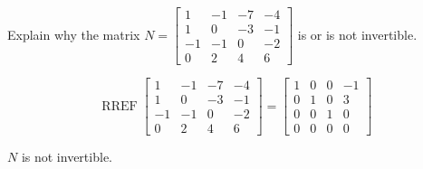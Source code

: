 
\begin{exerciseStatement}


Explain why the matrix \(N= \left[\begin{array}{cccc}
1 & -1 & -7 & -4 \\
1 & 0 & -3 & -1 \\
-1 & -1 & 0 & -2 \\
0 & 2 & 4 & 6
\end{array}\right] \) is or is not invertible.


\end{exerciseStatement}
    
\begin{exerciseAnswer} 


\[\operatorname{RREF} \left[\begin{array}{cccc}
1 & -1 & -7 & -4 \\
1 & 0 & -3 & -1 \\
-1 & -1 & 0 & -2 \\
0 & 2 & 4 & 6
\end{array}\right] = \left[\begin{array}{cccc}
1 & 0 & 0 & -1 \\
0 & 1 & 0 & 3 \\
0 & 0 & 1 & 0 \\
0 & 0 & 0 & 0
\end{array}\right] \]

\(N\) is not invertible.
\end{exerciseAnswer}
    
